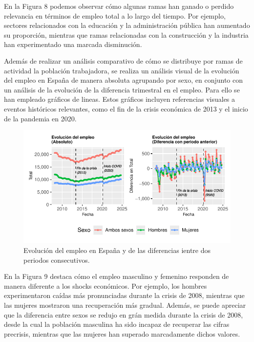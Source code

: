 \documentclass[Universitat de
València,article,submit,moreauthors,pdftex]{Definitions/mdpi}
\begin{document}
En la Figura 8 podemos observar cómo algunas ramas han ganado o perdido
relevancia en términos de empleo total a lo largo del tiempo. Por
ejemplo, sectores relacionados con la educación y la administración
pública han aumentado su proporción, mientras que ramas relacionadas con
la construcción y la industria han experimentado una marcada
disminución.

Además de realizar un análisis comparativo de cómo se distribuye por
ramas de actividad la población trabajadora, se realiza un análisis
visual de la evolución del empleo en España de manera absoluta agrupando
por sexo, en conjunto con un análisis de la evolución de la diferencia
trimestral en el empleo. Para ello se han empleado gráficos de lineas.
Estos gráficos incluyen referencias visuales a eventos históricos
relevantes, como el fin de la crisis económica de 2013 y el inicio de la
pandemia en 2020.

\begin{figure}

{\centering \includegraphics{ProyectoAED2024_files/figure-latex/unnamed-chunk-39-1} 

}

\caption{Evolución del empleo en España y de las diferencias ientre dos periodos consecutivos.}\label{fig:unnamed-chunk-39}
\end{figure}

En la Figura 9 destaca cómo el empleo masculino y femenino responden de
manera diferente a los shocks económicos. Por ejemplo, los hombres
experimentaron caídas más pronunciadas durante la crisis de 2008,
mientras que las mujeres mostraron una recuperación más gradual. Además,
se puede apreciar que la diferencia entre sexos se redujo en grán medida
durante la crisis de 2008, desde la cual la población masculina ha sido
incapaz de recuperar las cifras precrisis, mientras que las mujeres han
superado marcadamente dichos valores.
\end{document}
